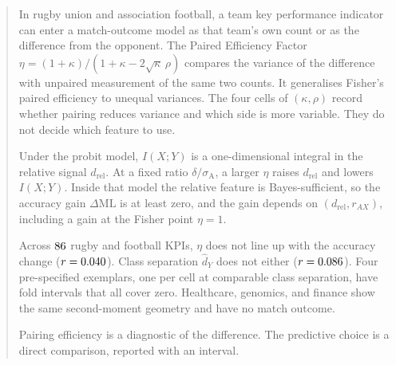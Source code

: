 \begin{abstract}
In rugby union and association football, a team key performance indicator can enter a match-outcome model as that team's own count or as the difference from the opponent. The Paired Efficiency Factor $\eta=(1+\kappa)/(1+\kappa-2\sqrt{\kappa}\,\rho)$ compares the variance of the difference with unpaired measurement of the same two counts. It generalises Fisher's paired efficiency to unequal variances. The four cells of $(\kappa,\rho)$ record whether pairing reduces variance and which side is more variable. They do not decide which feature to use.

Under the probit model, $I(X;Y)$ is a one-dimensional integral in the relative signal $d_{\mathrm{rel}}$. At a fixed ratio $\delta/\sigma_{\mathrm{A}}$, a larger $\eta$ raises $d_{\mathrm{rel}}$ and lowers $I(X;Y)$. Inside that model the relative feature is Bayes-sufficient, so the accuracy gain $\Delta\mathrm{ML}$ is at least zero, and the gain depends on $(d_{\mathrm{rel}},r_{AX})$, including a gain at the Fisher point $\eta=1$.

Across $\PEFtotalStudies$ rugby and football KPIs, $\eta$ does not line up with the accuracy change ($r=\PEFcorrEtaML$). Class separation $\hat d_Y$ does not either ($r=\PEFcorrIpredML$). Four pre-specified exemplars, one per cell at comparable class separation, have fold intervals that all cover zero. Healthcare, genomics, and finance show the same second-moment geometry and have no match outcome.

Pairing efficiency is a diagnostic of the difference. The predictive choice is a direct comparison, reported with an interval.
\end{abstract}
